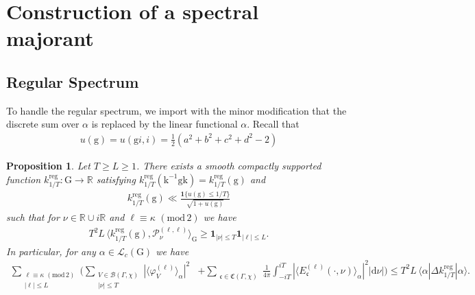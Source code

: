 \documentclass[12pt]{amsart}
\newtheorem{proposition}[theorem]{Proposition}
\theoremstyle{definition}
\theoremstyle{remark}
\numberwithin{equation}{section}
\newcommand{\B}{\mathcal{B}}
\newcommand{\G}{\mathrm{G}}
\newcommand{\PP}{\mathcal{P}}
\newcommand{\R}{{\mathbb R}}
\newcommand{\1}{{\mathbf 1}}
\newcommand{\g}{\mathrm{g}}
\renewcommand{\d}{\mathrm d}
\renewcommand{\pmod}[1]{\,\,(\mathrm{mod}\,{#1})}
\begin{document}
\section{Construction of a spectral majorant}



\subsection{Regular Spectrum}
To handle the regular spectrum, we import \cite[Proposition 6.1]{GM} with the minor modification that the discrete sum over $\alpha$ is replaced by the linear functional $\alpha$. Recall that 
\begin{align*}
    u(\g) = u(\g i,i) = \frac{1}{2}(a^2+b^2+c^2+d^2-2)
\end{align*}
\begin{proposition}\label{prop:regularboundbykernel}
Let  $ T \geq L \geq 1$.   There exists a smooth compactly supported function $k^\mathrm{reg}_{1/T}:\G \to \R $ satisfying $k^\mathrm{reg}_{1/T}(\mathrm{k}^{-1} \g \mathrm{k}) = k^\mathrm{reg}_{1/T}(\g)$ and
 \begin{align*}
    k^\mathrm{reg}_{1/T}(\g)\ll\frac{\mathbf{1}\{ u(\g)\leq 1/T\}}{\sqrt{1+u(\g)}}
 \end{align*}
such that for $\nu\in \R \cup i\R$ and $\ell\equiv \kappa\pmod{2}$ we have
 \begin{align*}
T^2 L \,  \langle   k^\mathrm{reg}_{1/T}(\g),\PP_\nu^{(\ell,\ell)} \rangle_\G \geq \mathbf{1}_{|\nu|\leq T} \mathbf{1}_{|\ell|\leq L}.
 \end{align*}
In particular,  for any $\alpha \in \mathcal{L}_c(\G)$ we have
    \begin{align*}
   \sum_{\substack{ \ell \equiv \kappa \pmod{2} \\ |\ell| \leq L} }    \bigg(\sum_{\substack{V \in \B(\Gamma,\chi)  \\ |\nu| \leq T }} | \langle\varphi_V^{(\ell)}\rangle_{\alpha} |^2& + \sum_{\substack{\mathfrak{c} \in \mathfrak{C}(\Gamma,\chi)}} \frac{1}{4\pi} \int_{-i T}^{iT}  |  \langle E^{(\ell)}_{\mathfrak{c}}(\cdot,\nu)\rangle_\alpha |^2 |\d \nu|  \bigg) \leq  T^2 L \, \langle \alpha|\Delta k^\mathrm{reg}_{1/T} | \alpha \rangle .
    \end{align*}   
\end{proposition}
\end{document}
